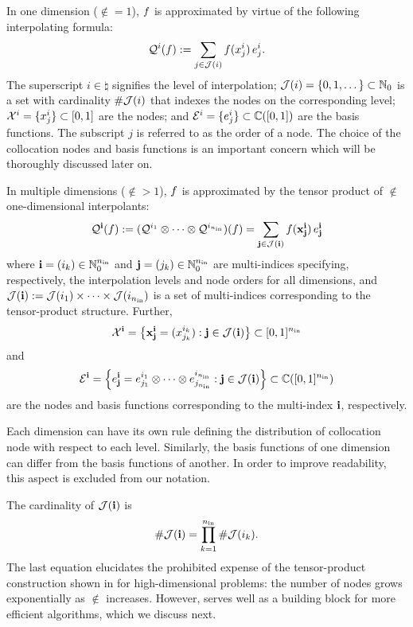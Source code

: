 In one dimension ($\nin = 1$), $f$ is approximated by virtue of the following
interpolating formula:
\begin{equation} \elab{tensor-1d}
  \tensor{i}(\f) := \sum_{j \in \index(i)} \f(\x^i_j) \, \e^i_j.
\end{equation}
The superscript $i \in \natural$ signifies the level of interpolation;
$\mathcal{J}(i) = \{ 0, 1, \dots \} \subset \mathbb{N}_0$ is a set with cardinality
$\# \mathcal{J}(i)$ that indexes the nodes on the corresponding level;
$\mathcal{X}^i = \{ x^i_j \} \subset [0, 1]$ are the nodes; and $\mathcal{E}^i = \{ e^i_j \}
\subset \mathbb{C}([0, 1])$ are the basis functions. The subscript $j$ is
referred to as the order of a node. The choice of the collocation nodes and
basis functions is an important concern which will be thoroughly discussed later
on.

In multiple dimensions ($\nin > 1$), $f$ is approximated by the tensor product
of $\nin$ one-dimensional interpolants:
\begin{equation} \elab{tensor}
  \tensor{\vi}(\f) := (\tensor{i_1} \otimes \cdots \otimes \tensor{i_\nin})(\f) = \sum_{\vj \in \index(\vi)} \f(\v{\x}^\vi_\vj) \, \e^\vi_\vj
\end{equation}
where $\mathbf{i} = (i_k) \in \mathbb{N}_0^{n_\text{in}}$ and $\mathbf{j} = (j_k) \in \mathbb{N}_0^{n_\text{in}}$ are
multi-indices specifying, respectively, the interpolation levels and node orders
for all dimensions, and $\mathcal{J}(\mathbf{i}) := \mathcal{J}(i_1) \times \cdots \times
\mathcal{J}(i_{n_\text{in}})$ is a set of multi-indices corresponding to the tensor-product
structure. Further,
\[
  \mathcal{X}^{\mathbf{i}} = \left\{ \mathbf{x}^{\mathbf{i}}_{\mathbf{j}} = (x^{i_k}_{j_k}): \mathbf{j} \in \mathcal{J}(\mathbf{i}) \right\} \subset [0, 1]^{n_\text{in}}
\]
and
\[
  \mathcal{E}^{\mathbf{i}} = \left\{ e^{\mathbf{i}}_{\mathbf{j}} = e^{i_1}_{j_1} \otimes \cdots \otimes e^{i_{n_\text{in}}}_{j_{n_\text{in}}}: \mathbf{j} \in \mathcal{J}(\mathbf{i}) \right\} \subset \mathbb{C}([0, 1]^{n_\text{in}})
\]
are the nodes and basis functions corresponding to the multi-index $\mathbf{i}$,
respectively.
\begin{remark}
Each dimension can have its own rule defining the distribution of collocation
node with respect to each level. Similarly, the basis functions of one dimension
can differ from the basis functions of another. In order to improve readability,
this aspect is excluded from our notation.
\end{remark}
The cardinality of $\mathcal{J}(\mathbf{i})$ is
\begin{equation} \elab{tensor-cardinality}
  \cardinality{\index(\vi)} = \prod_{k = 1}^\nin \cardinality{\index(i_k)}.
\end{equation}
The last equation elucidates the prohibited expense of the tensor-product
construction shown in  for high-dimensional problems: the number of
nodes grows exponentially as $\nin$ increases. However,  serves
well as a building block for more efficient algorithms, which we discuss next.
